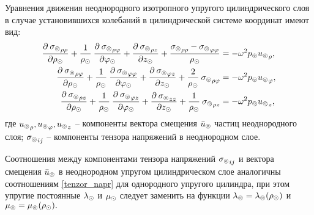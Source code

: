 Уравнения движения неоднородного изотропного упругого цилиндрического слоя в случае установившихся колебаний в цилиндрической системе координат имеют вид:
\begin{equation}\label{equation_dvij_splosh_sred}
\begin{aligned}
\frac{\partial\:{\sigma_\circledcirc}_{\rho\rho}}{
\partial \rho_\odot}+\frac{1}{\rho_\odot}\:\frac{\partial\:{\sigma_\circledcirc}_{\rho\varphi}}{\partial\varphi_\odot}+\frac{\partial\:{\sigma_\circledcirc}_{\rho z}}{\partial z_\odot}+\frac{{\sigma_\circledcirc}_{\rho\rho}-{\sigma_\circledcirc}_{\varphi\varphi}}{\rho_\odot}&=-\omega^2 p_\circledcirc{u_\circledcirc}_{\rho},\\
\frac{\partial\:{\sigma_\circledcirc}_{\rho\varphi}}{
\partial \rho_\odot}+\frac{1}{\rho_\odot}\:\frac{\partial\:{\sigma_\circledcirc}_{\varphi\varphi}}{\partial\varphi_\odot}+\frac{\partial\:{\sigma_\circledcirc}_{\varphi z}}{\partial z_\odot}+\frac{2}{\rho_\odot}\:{\sigma_\circledcirc}_{\rho\varphi}&=-\omega^2 p_\circledcirc{u_\circledcirc}_{\varphi},\\
\frac{\partial\:{\sigma_\circledcirc}_{\rho z}}{
\partial \rho_\odot}+\frac{1}{\rho_\odot}\:\frac{\partial\:{\sigma_\circledcirc}_{\varphi z}}{\partial\varphi_\odot}+\frac{\partial\:{\sigma_\circledcirc}_{zz}}{\partial z_\odot}+\frac{1}{\rho_\odot}\:{\sigma_\circledcirc}_{\rho z}&=-\omega^2 p_\circledcirc{u_\circledcirc}_{z},
\end{aligned}
\end{equation}
где ${u_\circledcirc}_{\rho}, {u_\circledcirc}_{\varphi}, {u_\circledcirc}_{z}$ -- компоненты вектора смещения $\bar{u}_\circledcirc$ частиц неоднородного слоя; 
\newline
${\sigma_\circledcirc}_{ij}$ -- компоненты тензора напряжений в неоднородном слое.

Соотношения между компонентами тензора напряжений ${\sigma_\circledcirc}_{ij}$ и вектора смещения $\bar{u}_\circledcirc$ в неоднородном упругом цилиндрическом слое аналогичны соотношениям \eqref{tenzor_napr} для однородного упругого цилиндра, при этом упругие постоянные $\lambda_\odot$ и $\mu_\odot$ следует заменить на функции $\lambda_\circledcirc=\lambda_\circledcirc(\rho_\odot)$ и $\mu_\circledcirc=\mu_\circledcirc(\rho_\odot).$

